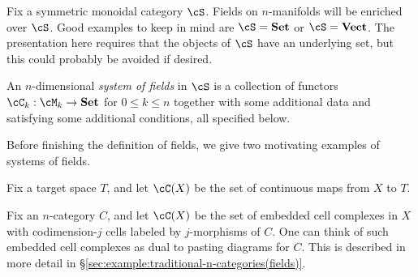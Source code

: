 Fix a symmetric monoidal category $\cS$.
Fields on $n$-manifolds will be enriched over $\cS$.
Good examples to keep in mind are $\cS = \Set$ or $\cS = \Vect$.
The presentation here requires that the objects of $\cS$ have an underlying set, 
but this could probably be avoided if desired.

An $n$-dimensional {\it system of fields} in $\cS$
is a collection of functors $\cC_k : \cM_k \to \Set$ for $0 \leq k \leq n$
together with some additional data and satisfying some additional conditions, all specified below.

Before finishing the definition of fields, we give two motivating examples of systems of fields.

\begin{example}
\label{ex:maps-to-a-space(fields)}
Fix a target space $T$, and let $\cC(X)$ be the set of continuous maps
from $X$ to $T$.
\end{example}

\begin{example}
\label{ex:traditional-n-categories(fields)}
Fix an $n$-category $C$, and let $\cC(X)$ be 
the set of embedded cell complexes in $X$ with codimension-$j$ cells labeled by
$j$-morphisms of $C$.
One can think of such embedded cell complexes as dual to pasting diagrams for $C$.
This is described in more detail in \S \ref{sec:example:traditional-n-categories(fields)}.
\end{example}

